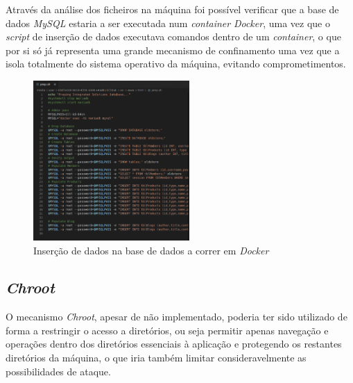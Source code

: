 \documentclass[10pt,english]{article}
\begin{document}
\par Através da análise dos ficheiros na máquina foi possível verificar que a base de dados \textit{MySQL} estaria a ser executada num \textit{container} \textit{Docker}, uma vez que o \textit{script} de inserção de dados executava comandos dentro de um \textit{container}, o que por si só já representa uma grande mecanismo de confinamento uma vez que a isola totalmente do sistema operativo da máquina, evitando comprometimentos.

\begin{figure}[h]
    \centering
    \includegraphics[width=225]{images/docker.png}
    \caption{Inserção de dados na base de dados a correr em \textit{Docker}}
\end{figure}

\clearpage



\subsection{\textit{Chroot}}
\par O mecanismo \textit{Chroot}, apesar de não implementado, poderia ter sido utilizado de forma a restringir o acesso a diretórios, ou seja permitir apenas navegação e operações dentro dos diretórios essenciais à aplicação e protegendo os restantes diretórios da máquina, o que iria também limitar consideravelmente as possibilidades de ataque.
\end{document}
